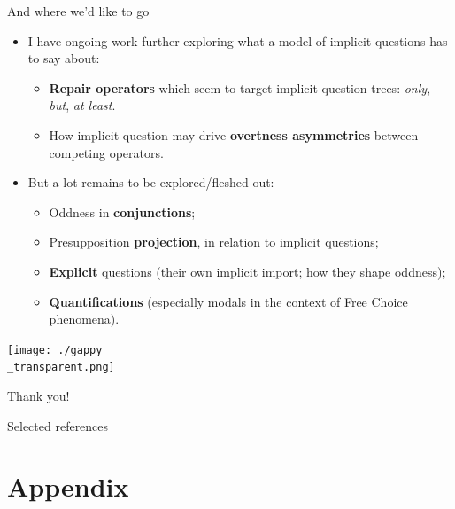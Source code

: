 \documentclass[10pt]{beamer}
\begin{document}
\begin{frame}{And where we'd like to go}
	\begin{itemize}
		\item I have ongoing work further exploring what a model of implicit questions has to say about:
		\begin{itemize}
			\item \textbf{Repair operators} which seem to target implicit question-trees: \textit{only}, \textit{but}, \textit{at least}.\footnotemark{}
			\item How implicit question may drive \textbf{overtness asymmetries} between competing operators.\footnotemark{}
		\end{itemize}
		\item But a lot remains to be explored/fleshed out:
		\begin{itemize}
			\item Oddness in \textbf{conjunctions};\footnotemark{}
			\item Presupposition \textbf{projection}, in relation to implicit questions;\footnotemark{}
			\item \textbf{Explicit} questions (their own implicit import; how they shape oddness\footnotemark{});
			\item \textbf{Quantifications} (especially modals in the context of Free Choice phenomena\footnotemark).
		\end{itemize} 
	\end{itemize}
	\begin{minipage}{.45\linewidth}
	\end{minipage}
	\begin{minipage}{.45\linewidth}
	\end{minipage}
\end{frame}

\usebackgroundtemplate%
{%
	\texttt{[image: ./gappy\\\_transparent.png]}%
}
\begin{frame}{}
	\begin{center}
		\Huge Thank you!
	\end{center}
\end{frame}
\usebackgroundtemplate{}

\begin{frame}[allowframebreaks]{Selected references}

	\printbibliography[heading=none]
\end{frame}

\section{Appendix}
\end{document}
